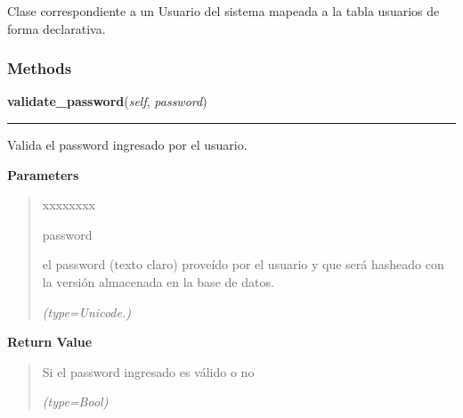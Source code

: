 Clase correspondiente a un Usuario del sistema mapeada a la tabla usuarios 
de forma declarativa.



  \subsubsection{Methods}

    \label{saip:model:auth:Usuario:validate_password}

    \vspace{0.5ex}

\hspace{.8\funcindent}\begin{boxedminipage}{\funcwidth}

    \raggedright \textbf{validate\_password}(\textit{self}, \textit{password})

    \vspace{-1.5ex}

    \rule{\textwidth}{0.5\fboxrule}
\setlength{\parskip}{2ex}
    Valida el password ingresado por el usuario.

\setlength{\parskip}{1ex}
      \textbf{Parameters}
      \vspace{-1ex}

      \begin{quote}
        \begin{Ventry}{xxxxxxxx}

          \item[password]

          el password (texto claro) proveído por el usuario y que será 
          hasheado con la versión almacenada en la base de datos.

            {\it (type=Unicode.)}

        \end{Ventry}

      \end{quote}

      \textbf{Return Value}
    \vspace{-1ex}

      \begin{quote}
      Si el password ingresado es válido o no

      {\it (type=Bool)}

      \end{quote}

    \end{boxedminipage}


